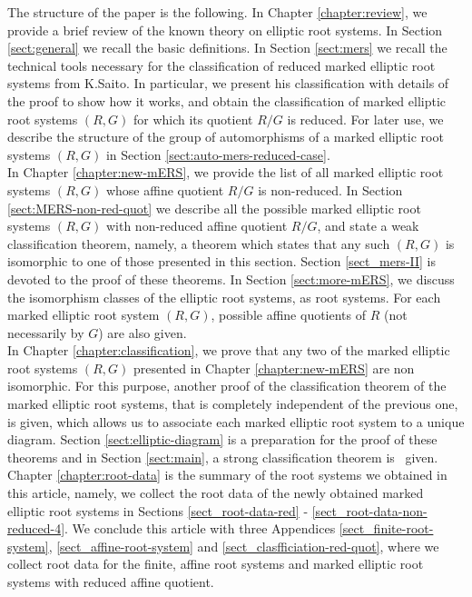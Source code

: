 \documentclass[11pt]{amsart}
\begin{document}
The structure of the paper is the following. 
In Chapter \ref{chapter:review}, we provide a brief review of the known theory on elliptic root systems.
In Section \ref{sect:general} we recall the basic definitions. In Section \ref{sect:mers} we recall the technical tools necessary for the classification of reduced marked elliptic root systems from K.Saito. In particular, we present his classification with details of the proof to show how it works, and obtain the classification of marked elliptic root systems $(R,G)$ for which its quotient $R/G$ is reduced. For later use, we describe the structure of the group of automorphisms of a marked elliptic root systems $(R,G)$ in Section \ref{sect:auto-mers-reduced-case}. \\
In Chapter \ref{chapter:new-mERS}, we  provide the list of all marked elliptic root systems $(R,G)$ whose affine quotient $R/G$ is non-reduced. 
In Section \ref{sect:MERS-non-red-quot} we describe all the possible marked elliptic root systems $(R,G)$ with non-reduced affine quotient $R/G$,
and state a weak classification theorem, namely, a theorem which states that any such $(R,G)$ is isomorphic to one of those presented in this section. Section \ref{sect_mers-II} is devoted to the proof of these theorems. In Section \ref{sect:more-mERS}, 
we discuss the isomorphism classes of the elliptic root systems, as root systems. For each marked elliptic root system $(R,G)$, 
possible affine quotients of $R$ (not necessarily by $G$) are also given. \\
In Chapter \ref{chapter:classification}, we prove that any two of the marked elliptic root systems $(R,G)$ presented in Chapter \ref{chapter:new-mERS} are non isomorphic. 
For this purpose, another proof of the classification theorem of the marked elliptic root systems, that is completely independent of the previous one, is given, which allows us to associate each marked elliptic root system to a unique diagram. Section \ref{sect:elliptic-diagram} is a preparation for the proof of these theorems and in Section \ref{sect:main}, a strong classification theorem is  given. 
Chapter \ref{chapter:root-data} is the summary of the root systems we obtained in this 
article, namely, we collect the root data of the newly obtained marked elliptic root 
systems in Sections \ref{sect_root-data-red} - \ref{sect_root-data-non-reduced-4}. We 
conclude this article with three Appendices \ref{sect_finite-root-system}, 
\ref{sect_affine-root-system} and \ref{sect_clasfficiation-red-quot}, where we collect 
 root data for the finite, affine root systems and marked elliptic root systems with reduced 
affine quotient.\\
 
\end{document}
